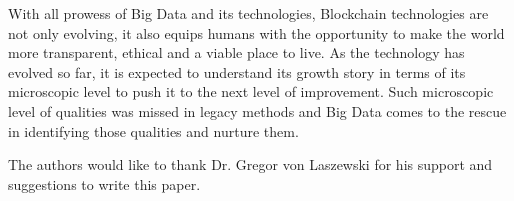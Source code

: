 \documentclass[sigconf]{acmart}
\begin{document}
With all prowess of Big Data and its technologies, Blockchain technologies are not only evolving, it also equips humans with the opportunity to make the world more transparent, ethical and a viable place to live. As the technology has evolved so far, it is expected to understand its growth story in terms of its microscopic level to push it to the next level of improvement. Such microscopic level of qualities was missed in legacy methods and Big Data comes to the rescue in identifying those qualities and nurture them.


\begin{acks}
  The authors would like to thank Dr. Gregor von Laszewski for his support and suggestions to write this paper.
\end{acks}


 
\end{document}
